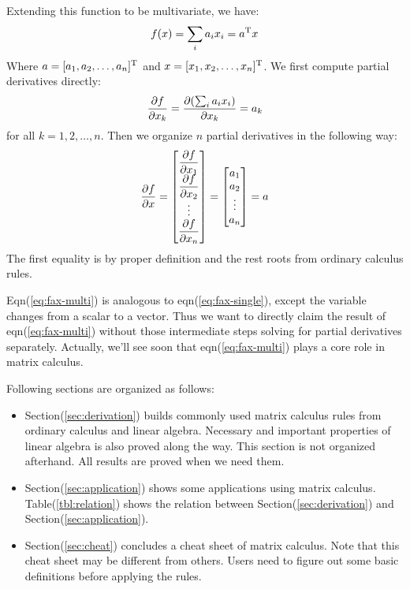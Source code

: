 Extending this function to be multivariate, we have:
\begin{equation}
	f(x) = \sum_{i}{a_ix_i} = a^\mathrm{T}x
\end{equation}
Where $a = [a_1,a_2,\ldots,a_n]^\mathrm{T}$ and 
$x = [x_1,x_2,\ldots,x_n]^\mathrm{T}$. 
We first compute partial derivatives directly:
\begin{equation}
	\dfrac{\partial f}{\partial x_k} = \dfrac{\partial (\sum_{i}{a_ix_i})}{\partial x_k} = a_k 
\end{equation}
for all $k=1,2, \ldots, n$. Then we organize $n$ partial derivatives
in the following way:
\begin{equation}
	\dfrac{\partial f}{\partial x} = \left[
	\begin{matrix}
		\dfrac{\partial f}{\partial x_1} \\
		\dfrac{\partial f}{\partial x_2} \\
		\vdots \\
		\dfrac{\partial f}{\partial x_n}
	\end{matrix}
	\right]
	= \left[
	\begin{matrix}
		a_1 \\
		a_2 \\
		\vdots \\
		a_n
	\end{matrix}
	\right]
	= a
	\label{eq:fax-multi}
\end{equation}
The first equality is by proper definition and the rest roots from 
ordinary calculus rules. 

Eqn(\ref{eq:fax-multi}) is analogous to eqn(\ref{eq:fax-single}), except
the variable changes from a scalar to a vector. Thus we want to directly 
claim the result of eqn(\ref{eq:fax-multi}) without those intermediate steps 
solving for partial derivatives separately. Actually, we'll see soon 
that eqn(\ref{eq:fax-multi}) plays a core role in matrix calculus. 

Following sections are organized as follows:
\begin{itemize}
	\item Section(\ref{sec:derivation}) builds commonly used 
	matrix calculus rules from ordinary calculus and linear 
	algebra. Necessary and important properties of linear 
	algebra is also proved along the way. This section is not 
	organized afterhand. All results are proved when we need them. 
	\item Section(\ref{sec:application}) shows some applications 
	using matrix calculus. Table(\ref{tbl:relation}) shows the relation
	between Section(\ref{sec:derivation}) and Section(\ref{sec:application}). 
	\item Section(\ref{sec:cheat}) concludes a cheat sheet of 
	matrix calculus. Note that this cheat sheet may be different 
	from others. Users need to figure out some basic definitions 
	before applying the rules. 
\end{itemize}

